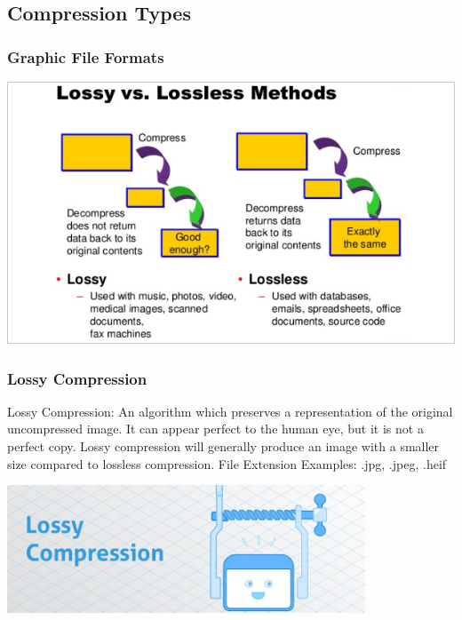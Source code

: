 \documentclass{beamer}
\begin{document}
	\subsection{Compression Types}
	\begin{frame}
	\frametitle{Graphic File Formats}
	\begin{center}
		\includegraphics[width=1.0\textwidth]{images/lossy vs lossless1.png}
	\end{center}
\end{frame}

	\begin{frame}
		\frametitle{Lossy Compression}
		\begin{outline}
			\1 Lossy Compression:
			\2 An algorithm which preserves a representation of the original uncompressed image.  
			\2 It can appear perfect to the human eye, but it is not a perfect copy.  
			\2 Lossy compression will generally produce an image with a smaller size compared to lossless compression.  
			\1 File Extension Examples:  
			\2 .jpg, .jpeg, .heif
		\end{outline}
		\begin{center}
			\includegraphics[width = 0.8\textwidth]{images/lossy compression.png}
		\end{center}
	\end{frame}
\end{document}
